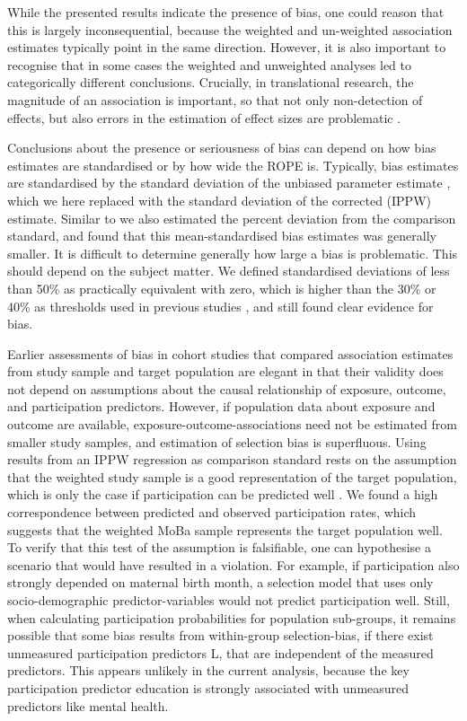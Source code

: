 \documentclass[12pt]{article}
\begin{document}
While the presented results indicate the presence of bias, one could reason that this is largely inconsequential, because the weighted and un-weighted association estimates typically point in the same direction. However, it is also important to recognise that in some cases the weighted and unweighted analyses led to categorically different conclusions. Crucially, in translational research, the magnitude of an association is important, so that not only non-detection of effects, but also errors in the estimation of effect sizes are problematic \cite{Sullivan2012-uc}.

Conclusions about the presence or seriousness of bias can depend on how bias estimates are standardised or by how wide the ROPE is. Typically, bias estimates are standardised by the standard deviation of the unbiased parameter estimate \cite{Austin2009-xk}, which we here replaced with the standard deviation of the corrected (IPPW) estimate. Similar to \citeauthor{Nilsen2009-ci} \cite{Nilsen2009-ci} we also estimated the percent deviation from the comparison standard, and found that this mean-standardised bias estimates was generally smaller. It is difficult to determine generally how large a bias is problematic. This should depend on the subject matter. We defined standardised deviations of less than 50\%  as practically equivalent with zero, which is higher than the 30\% or 40\% as thresholds used in previous studies \cite{Greene2011-am, Austin2009-xk}, and still found clear evidence for bias.

Earlier assessments of bias in cohort studies that compared association estimates from study sample and target population are elegant in that their validity does not depend on assumptions about the causal relationship of exposure, outcome, and participation predictors. However, if population data about exposure and outcome are available, exposure-outcome-associations need not be estimated from smaller study samples, and estimation of selection bias is superfluous. Using results from an IPPW regression as comparison standard rests on the assumption that the weighted study sample is a good representation of the target population, which is only the case if participation can be predicted well \cite{Seaman2013-rj}. We found a high correspondence between predicted and observed participation rates, which suggests that the weighted MoBa sample represents the target population well. To verify that this test of the assumption is falsifiable, one can hypothesise a scenario that would have resulted in a violation. For example, if participation also strongly depended on maternal birth month, a selection model that uses only socio-demographic predictor-variables would not predict participation well.  Still, when calculating participation probabilities for population sub-groups, it remains possible that some bias results from within-group selection-bias, if there exist unmeasured participation predictors L, that are independent of the measured predictors. This appears unlikely in the current analysis, because the key participation predictor education is strongly associated with unmeasured predictors like mental health.
\end{document}
